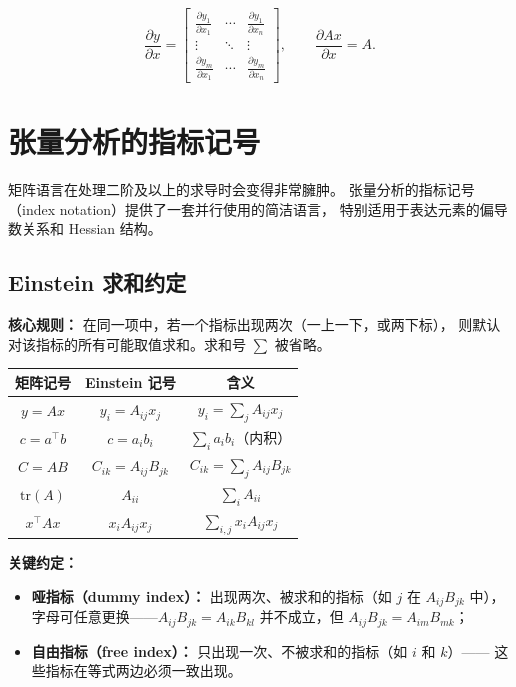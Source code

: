 \begin{equation}
    \frac{\partial y}{\partial x} =
    \begin{bmatrix}
        \frac{\partial y_1}{\partial x_1} & \cdots & \frac{\partial y_1}{\partial x_n} \\
        \vdots & \ddots & \vdots \\
        \frac{\partial y_m}{\partial x_1} & \cdots & \frac{\partial y_m}{\partial x_n}
    \end{bmatrix},
    \qquad
    \frac{\partial Ax}{\partial x} = A.
\end{equation}

\section{张量分析的指标记号}

矩阵语言在处理二阶及以上的求导时会变得非常臃肿。
张量分析的指标记号（index notation）提供了一套并行使用的简洁语言，
特别适用于表达元素的偏导数关系和 Hessian 结构。

\subsection{Einstein 求和约定}

\textbf{核心规则：} 在同一项中，若一个指标出现两次（一上一下，或两下标），
则默认对该指标的所有可能取值求和。求和号 $\sum$ 被省略。

\begin{center}
\renewcommand{\arraystretch}{1.6}
\begin{tabular}{c|c|c}
\toprule
\textbf{矩阵记号} & \textbf{Einstein 记号} & \textbf{含义} \\
\midrule
$y = Ax$ & $y_i = A_{ij} x_j$ & $y_i = \sum_{j} A_{ij} x_j$ \\
$c = a^\top b$ & $c = a_i b_i$ & $\sum_i a_i b_i$（内积） \\
$C = AB$ & $C_{ik} = A_{ij} B_{jk}$ & $C_{ik} = \sum_j A_{ij} B_{jk}$ \\
$\mathrm{tr}(A)$ & $A_{ii}$ & $\sum_i A_{ii}$ \\
$x^\top A x$ & $x_i A_{ij} x_j$ & $\sum_{i,j} x_i A_{ij} x_j$ \\
\bottomrule
\end{tabular}
\end{center}

\textbf{关键约定：}
\begin{itemize}
    \item \textbf{哑指标（dummy index）：} 出现两次、被求和的指标（如 $j$ 在 $A_{ij}B_{jk}$ 中），
    字母可任意更换——$A_{ij}B_{jk} = A_{ik}B_{kl}$ 并不成立，但 $A_{ij}B_{jk} = A_{im}B_{mk}$；
    \item \textbf{自由指标（free index）：} 只出现一次、不被求和的指标（如 $i$ 和 $k$）——
    这些指标在等式两边必须一致出现。
\end{itemize}

